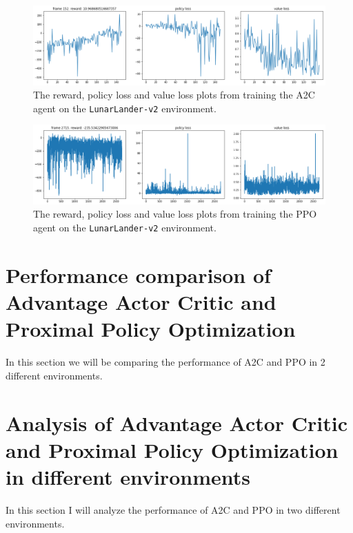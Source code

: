 \documentclass{article}
\begin{document}
  \begin{landscape}
   \begin{figure}
    \centering
    \includegraphics[height=0.41\textheight]{LunarLander-A2C-train}
    \caption{The reward, policy loss and value loss plots from training the A2C
             agent on the \texttt{LunarLander-v2} environment.}
    \label{ref:lunar-a2c-train}
   \end{figure}
 
   \begin{figure}
    \centering
    \includegraphics[height=0.41\textheight]{LunarLander-PPO-train}
    \caption{The reward, policy loss and value loss plots from training the PPO
             agent on the \texttt{LunarLander-v2} environment.}
    \label{fig:lunar-ppo-train}
   \end{figure}
  \end{landscape}

 \section[Performance comparison of A2C and PPO]{Performance comparison of 
   Advantage Actor Critic and Proximal Policy Optimization}
  In this section we will be comparing the performance of A2C and PPO in 2
  different environments.

 \section[Analysis of A2C and PPO in different environments]{Analysis of 
   Advantage Actor Critic and Proximal Policy Optimization in different 
   environments}
  In this section I will analyze the performance of A2C and PPO in two 
  different environments.
\end{document}
